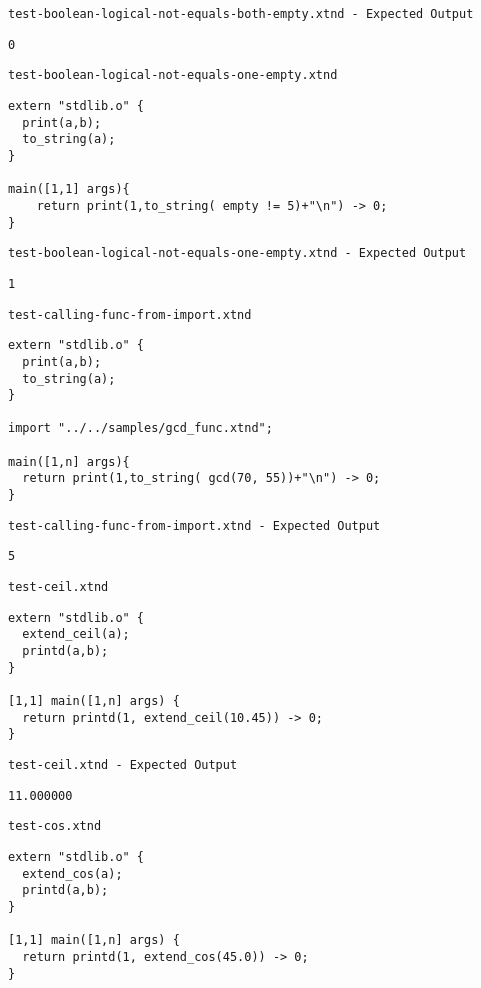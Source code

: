 \medskip \noindent \texttt{test-boolean-logical-not-equals-both-empty.xtnd - Expected Output}


\begin{lstlisting}
0
\end{lstlisting}


\medskip \noindent \texttt{test-boolean-logical-not-equals-one-empty.xtnd}


\begin{lstlisting}
extern "stdlib.o" {
  print(a,b);
  to_string(a);
}

main([1,1] args){
	return print(1,to_string( empty != 5)+"\n") -> 0;
}
\end{lstlisting}


\medskip \noindent \texttt{test-boolean-logical-not-equals-one-empty.xtnd - Expected Output}


\begin{lstlisting}
1
\end{lstlisting}


\medskip \noindent \texttt{test-calling-func-from-import.xtnd}


\begin{lstlisting}
extern "stdlib.o" {
  print(a,b);
  to_string(a);
}

import "../../samples/gcd_func.xtnd";

main([1,n] args){
  return print(1,to_string( gcd(70, 55))+"\n") -> 0;
}
\end{lstlisting}


\medskip \noindent \texttt{test-calling-func-from-import.xtnd - Expected Output}


\begin{lstlisting}
5
\end{lstlisting}


\medskip \noindent \texttt{test-ceil.xtnd}


\begin{lstlisting}
extern "stdlib.o" {
  extend_ceil(a);
  printd(a,b);
}

[1,1] main([1,n] args) {
  return printd(1, extend_ceil(10.45)) -> 0;
}
\end{lstlisting}


\medskip \noindent \texttt{test-ceil.xtnd - Expected Output}


\begin{lstlisting}
11.000000
\end{lstlisting}


\medskip \noindent \texttt{test-cos.xtnd}


\begin{lstlisting}
extern "stdlib.o" {
  extend_cos(a);
  printd(a,b);
}

[1,1] main([1,n] args) {
  return printd(1, extend_cos(45.0)) -> 0;
}
\end{lstlisting}



